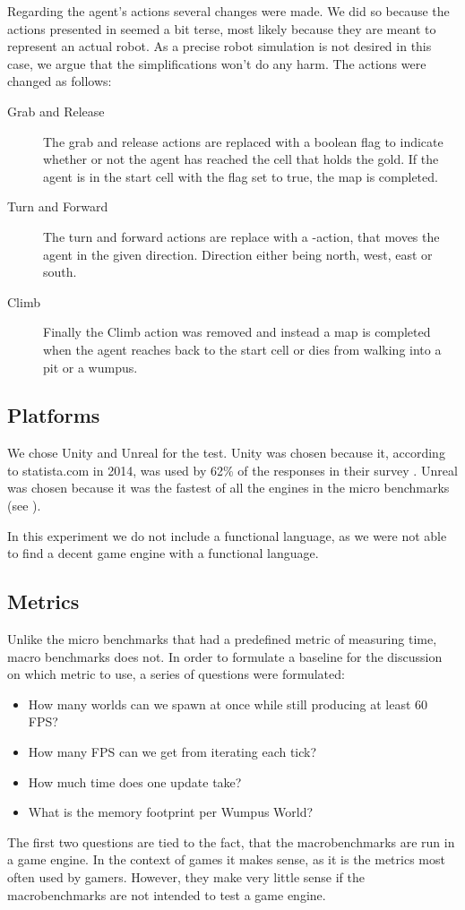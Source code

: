 Regarding the agent's actions several changes were made. We did so because the actions presented in \cite{wumpus:world} seemed a bit terse, most likely because they are meant to represent an actual robot. As a precise robot simulation is not desired in this case, we argue that the simplifications won't do any harm. The actions were changed as follows:
\begin{description}
    \item[Grab and Release] The grab and release actions are replaced with a boolean flag to indicate whether or not the agent has reached the cell that holds the gold. If the agent is in the start cell with the flag set to true, the map is completed.
    \item[Turn and Forward] The turn and forward actions are replace with a -action, that moves the agent in the given direction. Direction either being north, west, east or south.
    \item[Climb] Finally the Climb action was removed and instead a map is completed when the agent reaches back to the start cell or dies from walking into a pit or a wumpus.
\end{description}

\subsection{Platforms}
We chose Unity and Unreal for the test. Unity was chosen because it, according to statista.com in 2014, was used by 62\% of the responses in their survey \cite{gameengine:statista}.
Unreal was chosen because it was the fastest of all the engines in the micro benchmarks (see ).

In this experiment we do not include a functional language, as we were not able to find a decent game engine with a functional language.

\subsection{Metrics}
Unlike the micro benchmarks that had a predefined metric of measuring time, macro benchmarks does not. In order to formulate a baseline for the discussion on which metric to use, a series of questions were formulated:
\begin{itemize}
    \item How many worlds can we spawn at once while still producing at least 60 \ac{FPS}?
    \item How many \ac{FPS} can we get from iterating each tick?
    \item How much time does one update take?
    \item What is the memory footprint per Wumpus World?
\end{itemize}
The first two questions are tied to the fact, that the macrobenchmarks are run in a game engine. In the context of games it makes sense, as it is the metrics most often used by gamers. However, they make very little sense if the macrobenchmarks are not intended to test a game engine.

